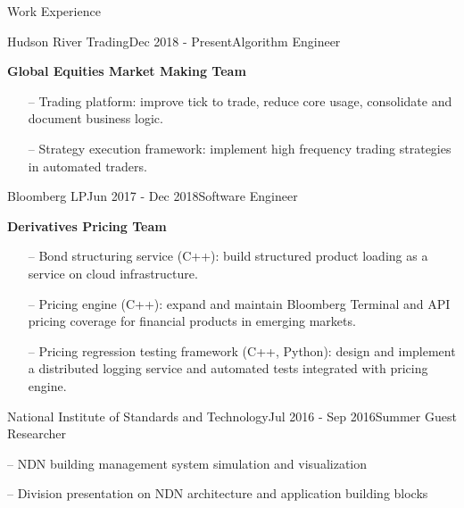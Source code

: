 \documentclass{resume} %
\begin{document}

\begin{rSection}{Work Experience}

\begin{rSubsection}{Hudson River Trading}{Dec 2018 - Present}{Algorithm Engineer}{}
\item \textbf{Global Equities Market Making Team}

\begin{itemize}[noitemsep,topsep=-6pt,leftmargin=1em]
\item[--] Trading platform: improve tick to trade, reduce core usage, consolidate and document business logic.
\item[--] Strategy execution framework: implement high frequency trading strategies in automated traders.
\end{itemize}

\end{rSubsection}

\begin{rSubsection}{Bloomberg LP}{Jun 2017 - Dec 2018}{Software Engineer}{}
\item \textbf{Derivatives Pricing Team}

\begin{itemize}[noitemsep,topsep=-6pt,leftmargin=1em]
\item[--] Bond structuring service (C++): build structured product loading as a service on cloud infrastructure.
\item[--] Pricing engine (C++): expand and maintain Bloomberg Terminal and API pricing coverage for financial products in emerging markets.
\item[--] Pricing regression testing framework (C++, Python): design and implement a distributed logging service and automated tests integrated with pricing engine.
\end{itemize}

\end{rSubsection}

\begin{rSubsection}{National Institute of Standards and Technology}{Jul 2016 - Sep 2016}{Summer Guest Researcher}{}
\item[--] NDN building management system simulation and visualization
\item[--] Division presentation on NDN architecture and application building blocks
\end{rSubsection}


\end{rSection}
\end{document}
